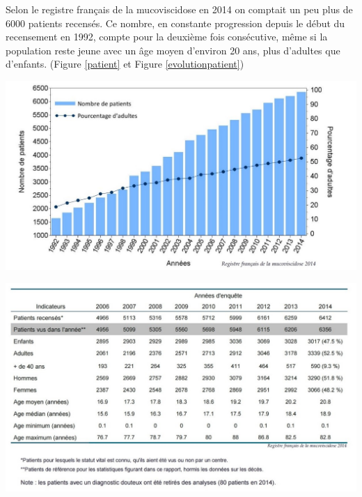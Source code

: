 Selon le registre français de la mucoviscidose en 2014 on comptait un peu plus de 6000 patients recensés. Ce nombre, en constante progression depuis le début du recensement en 1992, compte pour la deuxième fois consécutive, même si la population reste jeune avec un âge moyen d’environ 20 ans, plus d’adultes que d’enfants. (Figure \ref{patient} et Figure \ref{evolutionpatient})
\begin{center}
\includegraphics[scale=1]{gfx/patient.jpg} 
\captionsetup{type=figure}
       \label{patient}
\end{center}
\begin{center}
\includegraphics[scale=1]{gfx/evolutionpatient.jpg} 
\captionsetup{type=figure}
       \label{evolutionpatient}
\end{center}
	



